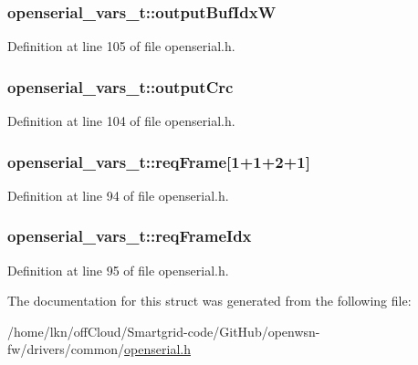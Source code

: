 \subsubsection[{\texorpdfstring{output\+Buf\+IdxW}{outputBufIdxW}}]{ openserial\+\_\+vars\+\_\+t\+::output\+Buf\+IdxW}\hypertarget{structopenserial__vars__t_a1f9a1d728df39d695458bdcb8fd4d0d9}{}\label{structopenserial__vars__t_a1f9a1d728df39d695458bdcb8fd4d0d9}


Definition at line 105 of file openserial.\+h.

\subsubsection[{\texorpdfstring{output\+Crc}{outputCrc}}]{ openserial\+\_\+vars\+\_\+t\+::output\+Crc}\hypertarget{structopenserial__vars__t_accd7c880a97b11c47d8d0c80df9a9a95}{}\label{structopenserial__vars__t_accd7c880a97b11c47d8d0c80df9a9a95}


Definition at line 104 of file openserial.\+h.

\subsubsection[{\texorpdfstring{req\+Frame}{reqFrame}}]{ openserial\+\_\+vars\+\_\+t\+::req\+Frame\mbox{[}1+1+2+1\mbox{]}}\hypertarget{structopenserial__vars__t_a7a7e14173525bd203f08e5292b9104c8}{}\label{structopenserial__vars__t_a7a7e14173525bd203f08e5292b9104c8}


Definition at line 94 of file openserial.\+h.

\subsubsection[{\texorpdfstring{req\+Frame\+Idx}{reqFrameIdx}}]{ openserial\+\_\+vars\+\_\+t\+::req\+Frame\+Idx}\hypertarget{structopenserial__vars__t_ae32c72c80c2d713890283c8423a2d91c}{}\label{structopenserial__vars__t_ae32c72c80c2d713890283c8423a2d91c}


Definition at line 95 of file openserial.\+h.



The documentation for this struct was generated from the following file\+:\begin{DoxyCompactItemize}
\item 
/home/lkn/off\+Cloud/\+Smartgrid-\/code/\+Git\+Hub/openwsn-\/fw/drivers/common/\hyperlink{openserial_8h}{openserial.\+h}\end{DoxyCompactItemize}
